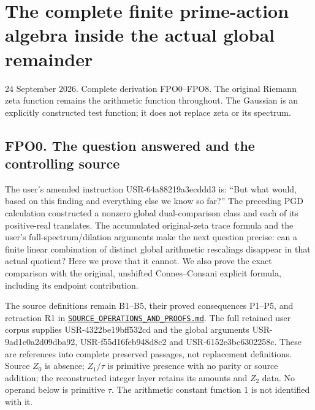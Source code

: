 \section{The complete finite prime-action algebra inside the actual
global
remainder}\label{the-complete-finite-prime-action-algebra-inside-the-actual-global-remainder}

24 September 2026. Complete derivation FPO0--FPO8. The original Riemann
zeta function remains the arithmetic function throughout. The Gaussian
is an explicitly constructed test function; it does not replace zeta or
its spectrum.

\subsection{FPO0. The question answered and the controlling
source}\label{fpo0.-the-question-answered-and-the-controlling-source}

The user's amended instruction USR-64a88219a3ecddd3 is: ``But what
would, based on this finding and everything else we know so far?'' The
preceding PGD calculation constructed a nonzero global dual-comparison
class and each of its positive-real translates. The accumulated
original-zeta trace formula and the user's full-spectrum/dilation
arguments make the next question precise: can a finite linear
combination of distinct global arithmetic rescalings disappear in that
actual quotient? Here we prove that it cannot. We also prove the exact
comparison with the original, unshifted Connes--Consani explicit
formula, including its endpoint contribution.

The source definitions remain B1--B5, their proved consequences P1--P5,
and retraction R1 in
\href{../foundations/user_definitions_20260924/SOURCE_OPERATIONS_AND_PROOFS.md}{\nolinkurl{SOURCE_OPERATIONS_AND_PROOFS.md}}.
The full retained user corpus supplies USR-4322be19bff532cd and the
global arguments USR-9ad1c0a2d09dba92, USR-f55d16feb948d8c2 and
USR-6152e3bc6302258c. These are references into complete preserved
passages, not replacement definitions. Source \(Z_0\) is absence;
\(Z_1/\tau\) is primitive presence with no parity or source addition;
the reconstructed integer layer retains its amounts and \(Z_2\) data. No
operand below is primitive \(\tau\). The arithmetic constant function
\(1\) is not identified with it.

